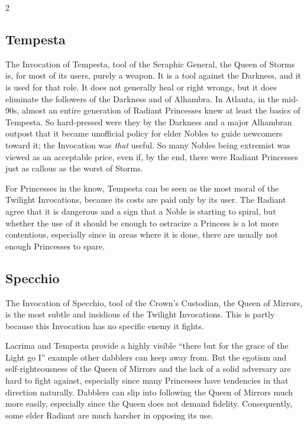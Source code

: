 \begin{multicols}{2}
\subsection*{Tempesta} 
The Invocation of Tempesta, tool of the Seraphic General, the Queen of Storms is, for most of its users, purely a weapon. It is a tool against the Darkness, and it is used for that role. It does not generally heal or right wrongs, but it does eliminate the followers of the Darkness and of Alhambra. In Atlanta, in the mid-90s, almost an entire generation of Radiant Princesses knew at least the basics of Tempesta. So hard-pressed were they by the Darkness and a major Alhambran outpost that it became unofficial policy for elder Nobles to guide newcomers toward it; the Invocation was \textit{that} useful. So many Nobles being extremist was viewed as an acceptable price, even if, by the end, there were Radiant Princesses just as callous as the worst of Storms.

For Princesses in the know, Tempesta can be seen as the most moral of the Twilight Invocations, because its costs are paid only by its user. The Radiant agree that it is dangerous and a sign that a Noble is starting to spiral, but whether the use of it should be enough to ostracize a Princess is a lot more contentious, especially since in areas where it is done, there are usually not enough Princesses to spare.

\subsection*{Specchio}
The Invocation of Specchio, tool of the Crown's Custodian, the Queen of Mirrors, is the most subtle and insidious of the Twilight Invocations. This is partly because this Invocation has no specific enemy it fights. 

Lacrima and Tempesta provide a highly visible “there but for the grace of the Light go I” example other dabblers can keep away from. But the egotism and self-righteousness of the Queen of Mirrors and the lack of a solid adversary are hard to fight against, especially since many Princesses have tendencies in that direction naturally. Dabblers can slip into following the Queen of Mirrors much more easily, especially since the Queen does not demand fidelity. Consequently, some elder Radiant are much harsher in opposing its use. 


\end{multicols}
